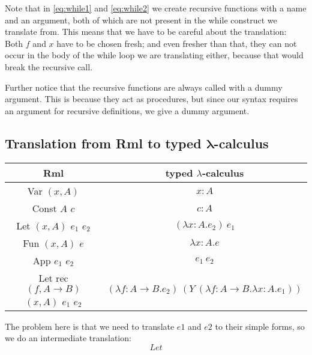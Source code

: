 \documentclass[11pt, leqno, titlepage]{article}
\theoremstyle{definition}
\begin{document}
Note that in \ref{eq:while1} and \ref{eq:while2} we create recursive functions with a
name and an argument, both of which are not present in the while construct we
translate from. This means that we have to be careful about the translation: Both $f$
and $x$ have to be chosen fresh; and even fresher than that, they can not occur in
the body of the while loop we are translating either, because that would break the
recursive call.

Further notice that the recursive functions are always called with a dummy
argument. This is because they act as procedures, but since our syntax requires an
argument for recursive definitions, we give a dummy argument.


\subsection{Translation from Rml to typed $\mathbf{\lambda}$-calculus}
\begin{center}
  \begin{tabular}{|c|c|}
    \hline
    Rml & typed $\lambda$-calculus \\ \hline
    Var $(x,A)$ & $x : A$ \\
    Const $A$ $c$ & $c : A$ \\
    Let $(x,A)$ $e_1$ $e_2$ & $(\lambda x : A. e_2)~e_1$ \\
    Fun $(x,A)$ $e$ & $\lambda x : A. e$ \\
    App $e_1$ $e_2$ & $e_1~e_2$ \\
    Let rec $(f,A \rightarrow B)$ $(x,A)$ $e_1$ $e_2$ & $(\lambda f : A \rightarrow B. e_2)~(Y~(\lambda f : A \rightarrow B. \lambda x : A. e_1))$ \\ \hline
  \end{tabular}
\end{center}
The problem here is that we need to translate \(e1\) and \(e2\) to their simple forms, so we do an intermediate translation:
\[Let\]
\end{document}
